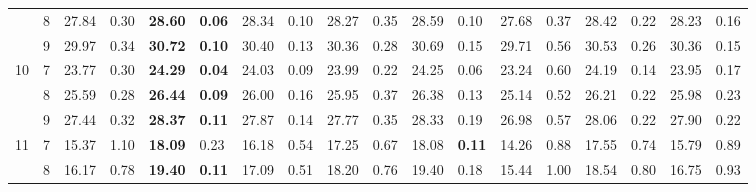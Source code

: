 \documentclass[conference]{IEEEtran}
\begin{document}
\begin{table}[]
\begin{tabular}{|cc|ll|ll|ll|ll|ll|ll|ll|ll|}
		\multicolumn{1}{|c|}{} & 8 & \multicolumn{1}{l|}{27.84} & 0.30 & \multicolumn{1}{l|}{\textbf{28.60}} & \textbf{0.06} & \multicolumn{1}{l|}{28.34} & 0.10 & \multicolumn{1}{l|}{28.27} & 0.35 & \multicolumn{1}{l|}{28.59} & 0.10 & \multicolumn{1}{l|}{27.68} & 0.37 & \multicolumn{1}{l|}{28.42} & 0.22 & \multicolumn{1}{l|}{28.23} & 0.16 \\ \cline{2-18} 
		\multicolumn{1}{|c|}{} & 9 & \multicolumn{1}{l|}{29.97} & 0.34 & \multicolumn{1}{l|}{\textbf{30.72}} & \textbf{0.10} & \multicolumn{1}{l|}{30.40} & 0.13 & \multicolumn{1}{l|}{30.36} & 0.28 & \multicolumn{1}{l|}{30.69} & 0.15 & \multicolumn{1}{l|}{29.71} & 0.56 & \multicolumn{1}{l|}{30.53} & 0.26 & \multicolumn{1}{l|}{30.36} & 0.15 \\ \hline
		\multicolumn{1}{|c|}{\multirow{3}{*}{10}} & 7 & \multicolumn{1}{l|}{23.77} & 0.30 & \multicolumn{1}{l|}{\textbf{24.29}} & \textbf{0.04} & \multicolumn{1}{l|}{24.03} & 0.09 & \multicolumn{1}{l|}{23.99} & 0.22 & \multicolumn{1}{l|}{24.25} & 0.06 & \multicolumn{1}{l|}{23.24} & 0.60 & \multicolumn{1}{l|}{24.19} & 0.14 & \multicolumn{1}{l|}{23.95} & 0.17 \\ \cline{2-18} 
		\multicolumn{1}{|c|}{} & 8 & \multicolumn{1}{l|}{25.59} & 0.28 & \multicolumn{1}{l|}{\textbf{26.44}} & \textbf{0.09} & \multicolumn{1}{l|}{26.00} & 0.16 & \multicolumn{1}{l|}{25.95} & 0.37 & \multicolumn{1}{l|}{26.38} & 0.13 & \multicolumn{1}{l|}{25.14} & 0.52 & \multicolumn{1}{l|}{26.21} & 0.22 & \multicolumn{1}{l|}{25.98} & 0.23 \\ \cline{2-18} 
		\multicolumn{1}{|c|}{} & 9 & \multicolumn{1}{l|}{27.44} & 0.32 & \multicolumn{1}{l|}{\textbf{28.37}} & \textbf{0.11} & \multicolumn{1}{l|}{27.87} & 0.14 & \multicolumn{1}{l|}{27.77} & 0.35 & \multicolumn{1}{l|}{28.33} & 0.19 & \multicolumn{1}{l|}{26.98} & 0.57 & \multicolumn{1}{l|}{28.06} & 0.22 & \multicolumn{1}{l|}{27.90} & 0.22 \\ \hline
		\multicolumn{1}{|c|}{\multirow{3}{*}{11}} & 7 & \multicolumn{1}{l|}{15.37} & 1.10 & \multicolumn{1}{l|}{\textbf{18.09}} & 0.23 & \multicolumn{1}{l|}{16.18} & 0.54 & \multicolumn{1}{l|}{17.25} & 0.67 & \multicolumn{1}{l|}{18.08} & \textbf{0.11} & \multicolumn{1}{l|}{14.26} & 0.88 & \multicolumn{1}{l|}{17.55} & 0.74 & \multicolumn{1}{l|}{15.79} & 0.89 \\ \cline{2-18} 
		\multicolumn{1}{|c|}{} & 8 & \multicolumn{1}{l|}{16.17} & 0.78 & \multicolumn{1}{l|}{\textbf{19.40}} & \textbf{0.11} & \multicolumn{1}{l|}{17.09} & 0.51 & \multicolumn{1}{l|}{18.20} & 0.76 & \multicolumn{1}{l|}{19.40} & 0.18 & \multicolumn{1}{l|}{15.44} & 1.00 & \multicolumn{1}{l|}{18.54} & 0.80 & \multicolumn{1}{l|}{16.75} & 0.93 \\ \cline{2-18} 

\end{tabular}
\end{table}
\end{document}
